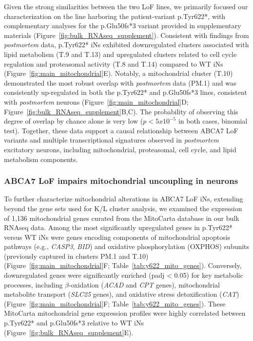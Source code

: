 Given the strong similarities between the two LoF lines, we primarily focused our characterization on the line harboring the patient-variant p.Tyr622*, with complementary analyses for the p.Glu50fs*3 variant provided in supplementary materials (Figure~\ref{fig:bulk_RNAseq_supplement}). Consistent with findings from \textit{postmortem} data, p.Tyr622* iNs exhibited downregulated clusters associated with lipid metabolism (T.9 and T.13) and upregulated clusters related to cell cycle regulation and proteasomal activity (T.8 and T.14) compared to WT iNs (Figure~\ref{fig:main_mitochondrial}E). Notably, a mitochondrial cluster (T.10) demonstrated the most robust overlap with \textit{postmortem} data (PM.1) and was consistently up-regulated in both the p.Tyr622* and p.Glu50fs*3 lines, consistent with \textit{postmortem} neurons (Figure~\ref{fig:main_mitochondrial}D; Figure~\ref{fig:bulk_RNAseq_supplement}B,C). The probability of observing this degree of overlap by chance alone is very low ($p<5x10^{-5}$ in both cases, binomial test). Together, these data support a causal relationship between ABCA7 LoF variants and multiple transcriptional signatures observed in \textit{postmortem} excitatory neurons, including mitochondrial, proteasomal, cell cycle, and lipid metabolism components.

\subsubsection{ABCA7 LoF impairs mitochondrial uncoupling in neurons}
To further characterize mitochondrial alterations in ABCA7 LoF iNs, extending beyond the gene sets used for K/L cluster analysis, we examined the expression of 1,136 mitochondrial genes curated from the MitoCarta database in our bulk RNAseq data. Among the most significantly upregulated genes in p.Tyr622* versus WT iNs were genes encoding components of mitochondrial apoptosis pathways (e.g., \textit{CASP3}, \textit{BID}) and oxidative phosphorylation (OXPHOS) subunits (previously captured in clusters PM.1 and T.10) (Figure~\ref{fig:main_mitochondrial}F; Table~\ref{tab:y622_mito_genes}). Conversely, downregulated genes were significantly enriched (padj < 0.05) for key metabolic processes, including $\beta$-oxidation (\textit{ACAD} and \textit{CPT} genes), mitochondrial metabolite transport (\textit{SLC25} genes), and oxidative stress detoxification (\textit{CAT}) (Figure~\ref{fig:main_mitochondrial}F; Table~\ref{tab:y622_mito_genes}). These MitoCarta mitochondrial gene expression profiles were highly correlated between p.Tyr622* and p.Glu50fs*3 relative to WT iNs (Figure~\ref{fig:bulk_RNAseq_supplement}E).

